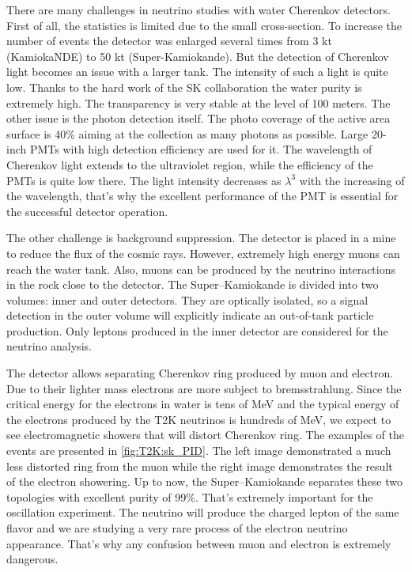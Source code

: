 \documentclass[../main.tex]{subfiles}
\begin{document}
There are many challenges in neutrino studies with water Cherenkov detectors. First of all, the statistics is limited due to the small cross-section. To increase the number of events the detector was enlarged several times from 3 kt (KamiokaNDE) to 50 kt (Super-Kamiokande). But the detection of Cherenkov light becomes an issue with a larger tank. The intensity of such a light is quite low. Thanks to the hard work of the SK collaboration the water purity is extremely high. The transparency is very stable at the level of 100 meters. The other issue is the photon detection itself. The photo coverage of the active area surface is 40\% aiming at the collection as many photons as possible. Large 20-inch PMTs with high detection efficiency are used for it. The wavelength of Cherenkov light extends to the ultraviolet region, while the efficiency of the PMTs is quite low there. The light intensity decreases as $\lambda^3$ with the increasing of the wavelength, that's why the excellent performance of the PMT is essential for the successful detector operation.

The other challenge is background suppression. The detector is placed in a mine to reduce the flux of the cosmic rays. However, extremely high energy muons can reach the water tank. Also, muons can be produced by the neutrino interactions in the rock close to the detector. The Super--Kamiokande is divided into two volumes: inner and outer detectors. They are optically isolated, so a signal detection in the outer volume will explicitly indicate an out-of-tank particle production. Only leptons produced in the inner detector are considered for the neutrino analysis.

The detector allows separating Cherenkov ring produced by muon and electron. Due to their lighter mass electrons are more subject to bremsstrahlung. Since the critical energy for the electrons in water is tens of MeV and the typical energy of the electrons produced by the T2K neutrinos is hundreds of MeV, we expect to see electromagnetic showers that will distort Cherenkov ring. The examples of the events are presented in \autoref{fig:T2K:sk_PID}. The left image demonstrated a much less distorted ring from the muon while the right image demonstrates the result of the electron showering. Up to now, the Super--Kamiokande separates these two topologies with excellent purity of 99\%. That's extremely important for the oscillation experiment. The neutrino will produce the charged lepton of the same flavor and we are studying a very rare process of the electron neutrino appearance. That's why any confusion between muon and electron is extremely dangerous.
\end{document}
